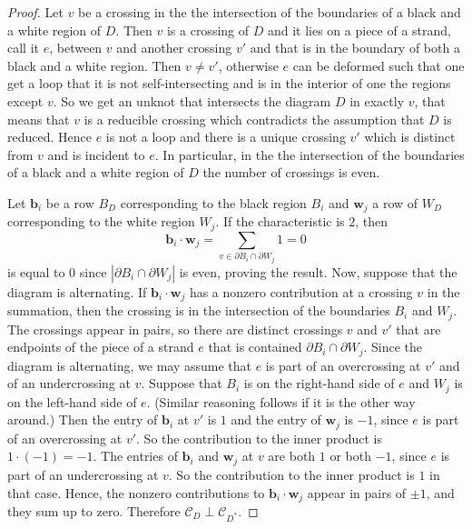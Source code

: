\documentclass[11pt,a4paper]{article}
\theoremstyle{definition}
\newcommand{\mC}{\mathcal{C}}
\begin{document}
 \begin{proof}
 Let $v$ be a crossing in the the intersection of the boundaries of a black and a white region of $D$.
 Then $v$ is a crossing of $D$ and it lies on a piece of a strand, call it $e$, between $v$ and another crossing $v'$ and 
 that is in the boundary of both a black and a white region.
 Then $v\not=v'$, otherwise $e$ can be deformed such that one get a loop that it is not self-intersecting and is in the interior of one the regions except $v$. So we get an unknot that intersects the diagram $D$ in exactly $v$, that means that $v$ is a reducible crossing which contradicts the assumption that $D$ is reduced. Hence $e$ is not a loop and there is a unique crossing $v'$ which is distinct from $v$ and is incident to $e$. In particular, in the the intersection of the boundaries of a black and a white region of $D$ the number of crossings is even.
 
 Let $\mathbf{b}_i$ be a row $B_D$ corresponding to the black region $B_i$ and $\mathbf{w}_j$ a row of $W_D$ corresponding to the white region $W_j$. If the characteristic is $2$, then
 \begin{equation*}
 \mathbf{b}_i \cdot \mathbf{w}_j =  \sum_{v \in \partial B_i \cap \partial W_j}1 = 0
 \end{equation*}
 is equal to 0 since $|\partial B_i \cap \partial W_j |$ is even, proving the result.
 Now, suppose that the diagram is alternating. 
 If $\mathbf{b}_i \cdot \mathbf{w}_j $ has a nonzero contribution at a crossing $v$ in the summation, 
 then the crossing is in the intersection of the boundaries $B_i$ and $W_j$. 
 The crossings appear in pairs, so  there are distinct crossings $v$ and $v'$ that are endpoints of the piece of a strand $e$ that is contained  
 $ \partial B_i \cap \partial W_j$. 
 Since the diagram is alternating, we may assume that $e$ is part of an overcrossing at $v'$ and of an undercrossing at $v$.
 Suppose that $B_i$ is on the right-hand side of $e$ and $W_j$ is on the left-hand side of $e$. (Similar reasoning follows if it is the other way around.) Then the entry of $ \mathbf{b}_i$ at $v'$ is $1$ and the entry of $ \mathbf{w}_j$ is $-1$, since $e$ is part of an overcrossing at $v'$. 
 So the contribution to the inner product is $1\cdot (-1)=-1$. 
 The entries of $ \mathbf{b}_i$ and $\mathbf{w}_j$ at $v$ are both $1$ or both $-1$, since $e$ is part of an undercrossing at $v$.
 So the contribution to the inner product is $1$ in that case. Hence, the nonzero contributions to $ \mathbf{b}_i \cdot \mathbf{w}_j$ appear in pairs of $\pm 1$,
 and they sum up to zero. Therefore $\mC_D \perp \mC_{D^*}$.
 

\end{proof}
\end{document}
